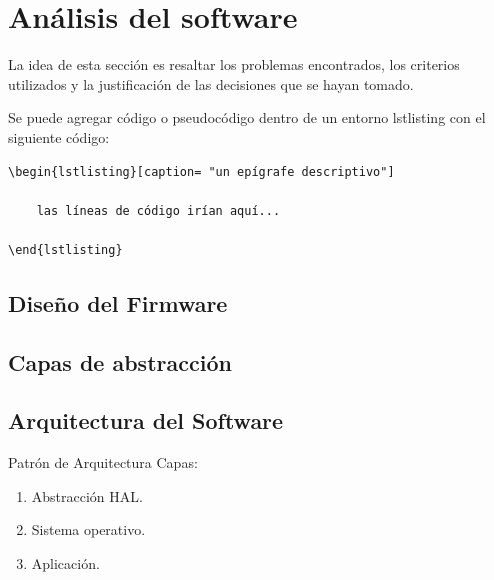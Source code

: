 \section{Análisis del software}
 
La idea de esta sección es resaltar los problemas encontrados, los criterios utilizados y la justificación de las decisiones que se hayan tomado.

Se puede agregar código o pseudocódigo dentro de un entorno lstlisting con el siguiente código:

\begin{verbatim}
\begin{lstlisting}[caption= "un epígrafe descriptivo"]

	las líneas de código irían aquí...
	
\end{lstlisting}
\end{verbatim}


\subsection{Diseño del Firmware}
\subsection{Capas de abstracción}
\subsection{Arquitectura del Software}

Patrón de Arquitectura
Capas: 
\begin{enumerate}
	\item Abstracción HAL.
	\item Sistema operativo.
	\item Aplicación.
\end{enumerate}

